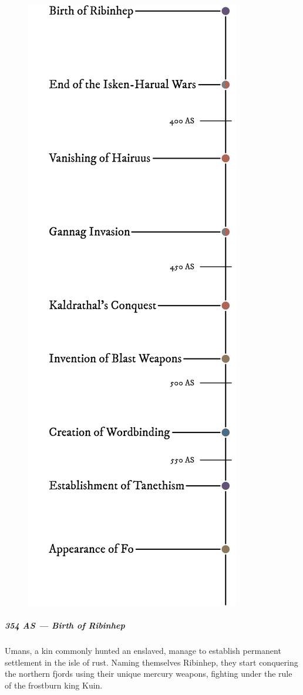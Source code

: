 \begin{figure}[H]
    \centering \includegraphics{01yuadrem/img/30history_v.png}
\end{figure}

\subparagraph{354 AS --- Birth of Ribinhep} Umans, a kin commonly hunted an enslaved, manage to establish permanent settlement in the isle of rust.
Naming themselves Ribinhep, they start conquering the northern fjords using their unique mercury weapons, fighting under the rule of the frostburn king Kuin.

